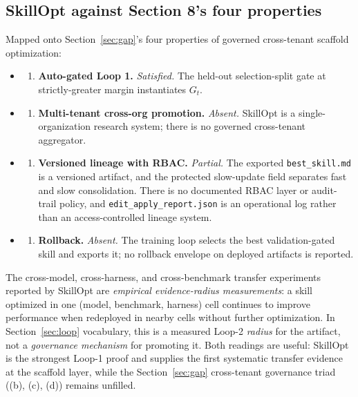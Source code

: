 \documentclass[
  11pt,
]{article}
\providecommand{\tightlist}{%
  \setlength{\itemsep}{0pt}\setlength{\parskip}{0pt}}
\begin{document}
\subsection{SkillOpt against Section 8's four properties}\label{app:families-10}

Mapped onto Section~\ref{sec:gap}'s four properties of governed cross-tenant scaffold optimization:

\begin{itemize}
\tightlist
\item
  \begin{enumerate}
  \def\labelenumi{(\alph{enumi})}
  \tightlist
  \item
    \textbf{Auto-gated Loop 1.} \emph{Satisfied.} The held-out selection-split gate at strictly-greater margin instantiates \(G_t\).
  \end{enumerate}
\item
  \begin{enumerate}
  \def\labelenumi{(\alph{enumi})}
  \setcounter{enumi}{1}
  \tightlist
  \item
    \textbf{Multi-tenant cross-org promotion.} \emph{Absent.} SkillOpt is a single-organization research system; there is no governed cross-tenant aggregator.
  \end{enumerate}
\item
  \begin{enumerate}
  \def\labelenumi{(\alph{enumi})}
  \setcounter{enumi}{2}
  \tightlist
  \item
    \textbf{Versioned lineage with RBAC.} \emph{Partial.} The exported \texttt{best\_skill.md} is a versioned artifact, and the protected slow-update field separates fast and slow consolidation. There is no documented RBAC layer or audit-trail policy, and \texttt{edit\_apply\_report.json} is an operational log rather than an access-controlled lineage system.
  \end{enumerate}
\item
  \begin{enumerate}
  \def\labelenumi{(\alph{enumi})}
  \setcounter{enumi}{3}
  \tightlist
  \item
    \textbf{Rollback.} \emph{Absent.} The training loop selects the best validation-gated skill and exports it; no rollback envelope on deployed artifacts is reported.
  \end{enumerate}
\end{itemize}

The cross-model, cross-harness, and cross-benchmark transfer experiments reported by SkillOpt are \emph{empirical evidence-radius measurements}: a skill optimized in one (model, benchmark, harness) cell continues to improve performance when redeployed in nearby cells without further optimization. In Section~\ref{sec:loop} vocabulary, this is a measured Loop-2 \emph{radius} for the artifact, not a \emph{governance mechanism} for promoting it. Both readings are useful: SkillOpt is the strongest Loop-1 proof and supplies the first systematic transfer evidence at the scaffold layer, while the Section~\ref{sec:gap} cross-tenant governance triad ((b), (c), (d)) remains unfilled.
\end{document}
